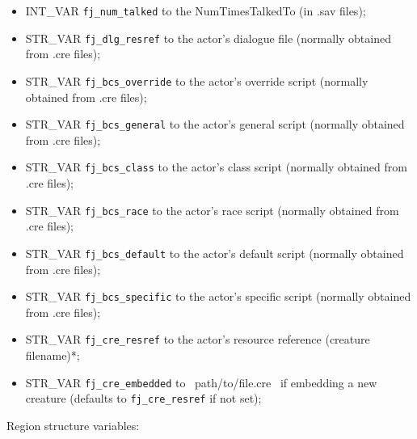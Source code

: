 \documentclass{article}
\begin{document}
\begin{itemize}
\item INT_VAR \verb+fj_num_talked+ to the NumTimesTalkedTo (in .sav files);
\item STR_VAR \verb+fj_dlg_resref+ to the actor's dialogue file (normally obtained from .cre files);
\item STR_VAR \verb+fj_bcs_override+ to the actor's override script (normally obtained from .cre files);
\item STR_VAR \verb+fj_bcs_general+ to the actor's general script (normally obtained from .cre files);
\item STR_VAR \verb+fj_bcs_class+ to the actor's class script (normally obtained from .cre files);
\item STR_VAR \verb+fj_bcs_race+ to the actor's race script (normally obtained from .cre files);
\item STR_VAR \verb+fj_bcs_default+ to the actor's default script (normally obtained from .cre files);
\item STR_VAR \verb+fj_bcs_specific+ to the actor's specific script (normally obtained from .cre files);
\item STR_VAR \verb+fj_cre_resref+ to the actor's resource reference (creature filename)*;
\item STR_VAR \verb+fj_cre_embedded+ to ~path/to/file.cre~ if embedding a new creature (defaults to \verb+fj_cre_resref+ if not set);
\end{itemize}
Region structure variables:
\end{document}

